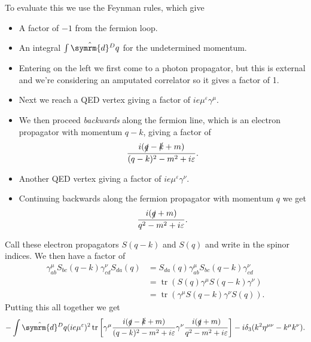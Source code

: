\documentclass[fleqn]{NotesClass}
\newcommand{\dhat}[1]{\hat{\symrm{d}}{#1}}
\newcommand{\minkowskiMetric}{\eta}
\DeclareMathOperator{\tr}{tr}
\begin{document}
    To evaluate this we use the Feynman rules, which give
    \begin{itemize}
        \item A factor of \(-1\) from the fermion loop.
        \item An integral \(\int \dhat{^Dq}\) for the undetermined momentum.
        \item Entering on the left we first come to a photon propagator, but this is external and we're considering an amputated correlator so it gives a factor of 1.
        \item Next we reach a QED vertex giving a factor of \(ie\mu^\varepsilon \gamma^\mu\).
        \item We then proceed \emph{backwards} along the fermion line, which is an electron propagator with momentum \(q - k\), giving a factor of
        \begin{equation}
            \frac{i(\slashed{q} - \slashed{k} + m)}{(q - k)^2 - m^2 + i\varepsilon}.
        \end{equation}
        \item Another QED vertex giving a factor of \(ie\mu^\varepsilon \gamma^\nu\).
        \item Continuing backwards along the fermion propagator with momentum \(q\) we get
        \begin{equation}
            \frac{i(\slashed{q} + m)}{q^2 - m^2 + i\varepsilon}.
        \end{equation}
    \end{itemize}
    Call these electron propagators \(S(q - k)\) and \(S(q)\) and write in the spinor indices.
    We then have a factor of
    \begin{align}
        \gamma^\mu_{ab} S_{bc}(q - k)\gamma^\nu_{cd}S_{da}(q) &= S_{da}(q)\gamma^\mu_{ab} S_{bc}(q - k)\gamma^\nu_{cd}\\
        &= \tr(S(q)\gamma^\mu S(q - k)\gamma^\nu)\\
        &= \tr(\gamma^\mu S(q - k)\gamma^\nu S(q)).
    \end{align}
    Putting this all together we get
    \begin{equation*}
        -\int \dhat{^Dq} (ie\mu^\varepsilon)^2 \tr\left[ \gamma^\mu \frac{i(\slashed{q} - \slashed{k} + m)}{(q - k)^2 - m^2 + i\varepsilon} \gamma^\nu \frac{i(\slashed{q} + m)}{q^2 - m^2 + i\varepsilon} \right] - i\delta_3(k^2\minkowskiMetric^{\mu\nu} - k^\mu k^\nu).
    \end{equation*}
    
\end{document}
